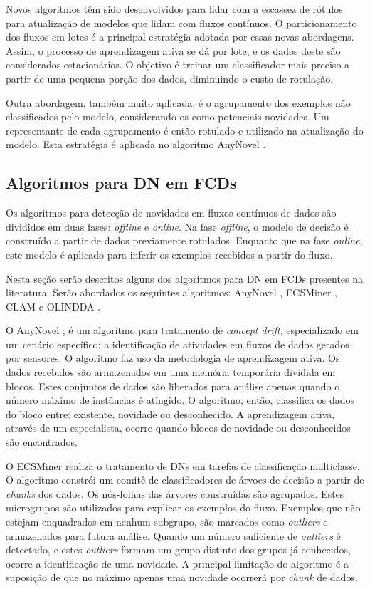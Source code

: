 \documentclass[qual, classic, a4paper]{ufbathesis}
\begin{document}
Novos algoritmos têm sido desenvolvidos para lidar com a escassez de rótulos para atualização de modelos que lidam com fluxos contínuos. 
O particionamento dos fluxos em lotes é a principal estratégia adotada por essas novas abordagens. Assim, o processo de aprendizagem ativa se dá por lote, e os dados deste são considerados estacionários. O objetivo é treinar um classificador mais preciso a partir de uma pequena porção dos dados, diminuindo o custo de rotulação.

Outra abordagem, também muito aplicada, é o agrupamento dos exemplos não classificados pelo modelo, considerando-os como potenciais novidades. Um representante de cada agrupamento é então rotulado e utilizado na atualização do modelo. Esta estratégia é aplicada no algoritmo AnyNovel \cite{Abdallah}.

\subsection{Algoritmos para DN em FCDs}

Os algoritmos para detecção de novidades em fluxos contínuos de dados são divididos em duas fases: \textit{offline} e \textit{online}. Na fase \textit{offline}, o modelo de decisão é construído a partir de dados previamente rotulados. Enquanto que na fase \textit{online}, este modelo é aplicado para inferir os exemplos recebidos a partir do fluxo. 

Nesta seção serão descritos alguns dos algoritmos para DN em FCDs presentes na literatura. Serão abordados os seguintes algoritmos: AnyNovel \cite{Abdallah}, ECSMiner \cite{Masud:2010:ACC:1933307.1934606}, CLAM \cite{malkhateeb} e OLINDDA \cite{Spinosa:2009:NDA:1551768.1551770}.

O AnyNovel \cite{Abdallah}, é um algoritmo para tratamento de \textit{concept drift}, especializado em um cenário específico: a identificação de atividades em fluxos de dados gerados por sensores. O algoritmo faz uso da metodologia de aprendizagem ativa. Os dados recebidos são armazenados em uma memória temporária dividida em blocos. Estes conjuntos de dados são liberados para análise apenas quando o número máximo de instâncias é atingido. O algoritmo, então, classifica os dados do bloco entre: existente, novidade ou desconhecido. A aprendizagem ativa, através de um especialista, ocorre quando blocos de novidade ou desconhecidos são encontrados.

O ECSMiner \cite{Masud:2010:ACC:1933307.1934606} realiza o tratamento de DNs em tarefas de classificação multiclasse. O algoritmo constrói um comitê de classificadores de árvoes de decisão a partir de \textit{chunks} dos dados. Os nós-folhas das árvores construídas são agrupados.
Estes microgrupos são utilizados para explicar os exemplos do fluxo. Exemplos que não estejam enquadrados em nenhum subgrupo, são marcados como \textit{outliers} e armazenados para futura análise. 
Quando um número suficiente de \textit{outliers} é detectado, e estes \textit{outliers} formam um grupo distinto dos grupos já conhecidos, ocorre a identificação de uma novidade. A principal limitação do algoritmo é a suposição de que no máximo apenas uma novidade ocorrerá por \textit{chunk} de dados.
\end{document}
